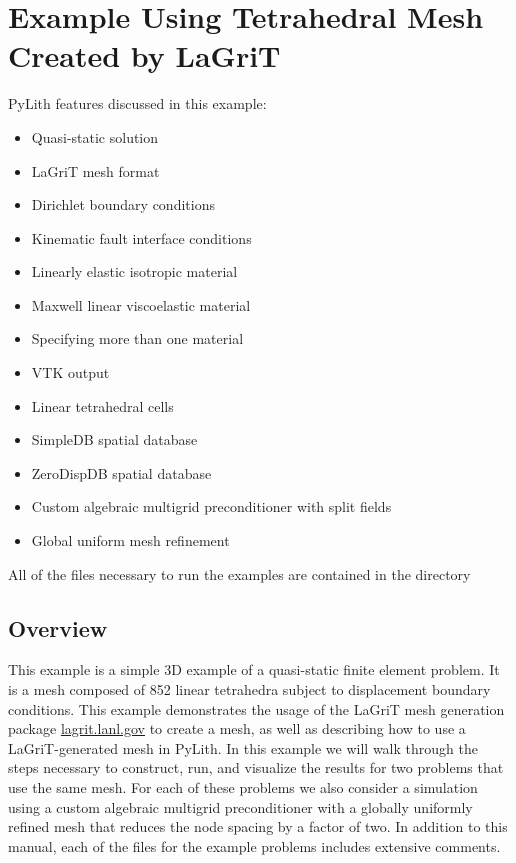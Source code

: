 \section{Example Using Tetrahedral Mesh Created by LaGriT}
\label{sec:example:3dtet4}

PyLith features discussed in this example:
\begin{itemize}
\item Quasi-static solution
\item LaGriT mesh format
\item Dirichlet boundary conditions
\item Kinematic fault interface conditions
\item Linearly elastic isotropic material
\item Maxwell linear viscoelastic material
\item Specifying more than one material
\item VTK output
\item Linear tetrahedral cells
\item SimpleDB spatial database
\item ZeroDispDB spatial database
\item Custom algebraic multigrid preconditioner with split fields
\item Global uniform mesh refinement
\end{itemize}
All of the files necessary to run the examples are contained in the
directory 


\subsection{Overview}

This example is a simple 3D example of a quasi-static finite element
problem. It is a mesh composed of 852 linear tetrahedra subject to
displacement boundary conditions. This example demonstrates the usage
of the LaGriT mesh generation package \url{lagrit.lanl.gov} to create
a mesh, as well as describing how to use a LaGriT-generated mesh in
PyLith. In this example we will walk through the steps necessary
to construct, run, and visualize the results for two problems that
use the same mesh. For each of these problems we also consider a simulation
using a custom algebraic multigrid preconditioner with a globally
uniformly refined mesh that reduces the node spacing by a factor of
two. In addition to this manual, each of the files for the example
problems includes extensive comments.


